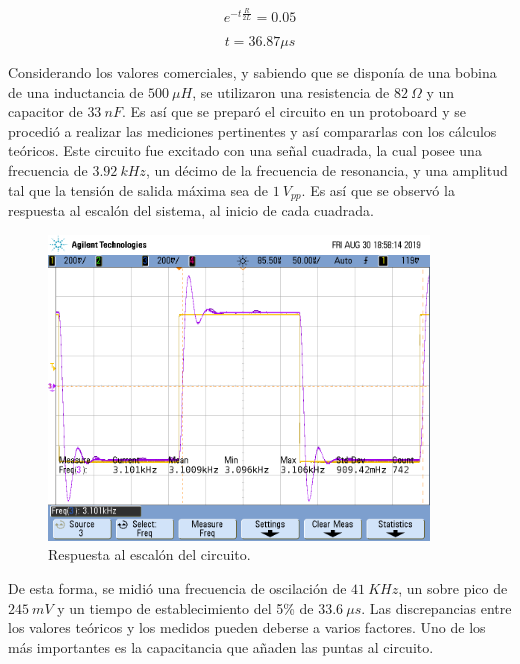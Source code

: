 \begin{equation}
	e^{-t\frac{R}{2L}} = 0.05
\end{equation}

\begin{equation}
	t=36.87\mu s
\end{equation}

Considerando los valores comerciales, y sabiendo que se disponía de una bobina de una inductancia de $500 \ \mu H$, se utilizaron una resistencia de $82 \ \Omega$ y un capacitor de $33 \ nF$. Es así que se preparó el circuito en un protoboard y se procedió a realizar las mediciones pertinentes y así compararlas con los cálculos teóricos. Este circuito fue excitado con una señal cuadrada, la cual posee una frecuencia de $3.92 \ kHz$, un décimo de la frecuencia de resonancia, y una amplitud tal que la tensión de salida máxima sea de $1 \ V_{pp}$. Es así que se observó la respuesta al escalón del sistema, al inicio de cada cuadrada.

\begin{figure}[H]
	\centering
	\includegraphics[width=0.9\textwidth, trim = {0 3.4cm 0.4cm 2cm},clip]{Ejercicio2/Mediciones/A/waveform1.png}
\caption{Respuesta al escalón del circuito.}
	\label{fig:rtaescalon}
\end{figure}

De esta forma, se midió una frecuencia de oscilación de $41 \ KHz $, un sobre pico de $245 \ mV$ y un tiempo de establecimiento del 5\% de $33.6 \ \mu s$. Las discrepancias entre los valores teóricos y los medidos pueden deberse a varios factores. Uno de los más importantes es la capacitancia que añaden las puntas al circuito.

